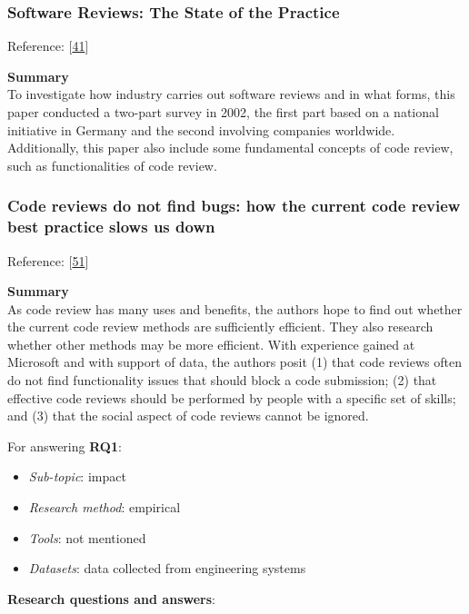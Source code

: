 \documentclass[]{book}
\providecommand{\tightlist}{%
  \setlength{\itemsep}{0pt}\setlength{\parskip}{0pt}}
\begin{document}
\subsubsection{Software Reviews: The State of the
Practice}\label{software-reviews-the-state-of-the-practice}

Reference: {[}\protect\hyperlink{ref-ciolkowski2003software}{41}{]}

\textbf{Summary}\\
To investigate how industry carries out software reviews and in what
forms, this paper conducted a two-part survey in 2002, the first part
based on a national initiative in Germany and the second involving
companies worldwide. Additionally, this paper also include some
fundamental concepts of code review, such as functionalities of code
review.

\subsubsection{Code reviews do not find bugs: how the current code
review best practice slows us
down}\label{code-reviews-do-not-find-bugs-how-the-current-code-review-best-practice-slows-us-down}

Reference: {[}\protect\hyperlink{ref-czerwonka2015code}{51}{]}

\textbf{Summary}\\
As code review has many uses and benefits, the authors hope to find out
whether the current code review methods are sufficiently efficient. They
also research whether other methods may be more efficient. With
experience gained at Microsoft and with support of data, the authors
posit (1) that code reviews often do not find functionality issues that
should block a code submission; (2) that effective code reviews should
be performed by people with a specific set of skills; and (3) that the
social aspect of code reviews cannot be ignored.

For answering \textbf{RQ1}:

\begin{itemize}
\tightlist
\item
  \emph{Sub-topic}: impact
\item
  \emph{Research method}: empirical
\item
  \emph{Tools}: not mentioned
\item
  \emph{Datasets}: data collected from engineering systems
\end{itemize}

\textbf{Research questions and answers}:
\end{document}
